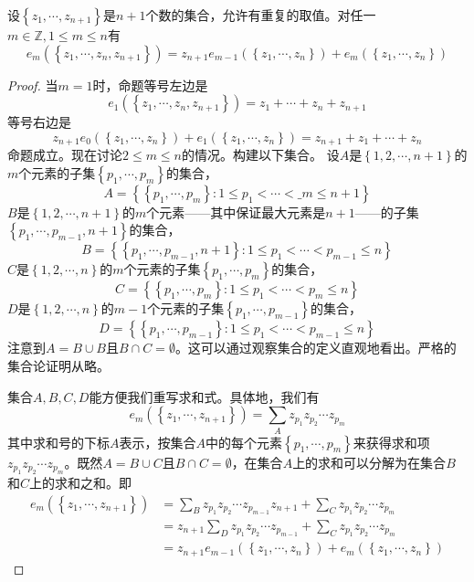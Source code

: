\documentclass[../main.tex]{subfiles}
\begin{document}
\begin{lemma}[初等对称函数的递归性质]\label{lem:A.5}
    设$\left\{z_1,\cdots,z_{n+1}\right\}$是$n+1$个数的集合，允许有重复的取值。对任一$m\in\mathbb{Z},1\leq m\leq n$有
    \[e_m\left(\left\{z_1,\cdots,z_n,z_{n+1}\right\}\right)=z_{n+1}e_{m-1}\left(\left\{z_1,\cdots,z_n\right\}\right)+e_m\left(\left\{z_1,\cdots,z_n\right\}\right)\]
\end{lemma}
\begin{proof}
    当$m=1$时，命题等号左边是
    \[e_1\left(\left\{z_1,\cdots,z_n,z_{n+1}\right\}\right)=z_1+\cdots+z_n+z_{n+1}\]
    等号右边是
    \[z_{n+1}e_0\left(\left\{z_1,\cdots,z_n\right\}\right)+e_1\left(\left\{z_1,\cdots,z_n\right\}\right)=z_{n+1}+z_1+\cdots+z_n\]
    命题成立。现在讨论$2\leq m\leq n$的情况。构建以下集合。
    设$A$是$\left\{1,2,\cdots,n+1\right\}$的$m$个元素的子集$\left\{p_1,\cdots,p_m\right\}$的集合，
    \[A=\left\{\left\{p_1,\cdots,p_m\right\}:1\leq p_1<\cdots<\_m\leq n+1\right\}\]
    $B$是$\left\{1,2,\cdots,n+1\right\}$的$m$个元素——其中保证最大元素是$n+1$——的子集$\left\{p_1,\cdots,p_{m-1},n+1\right\}$的集合，
    \[B=\left\{\left\{p_1,\cdots,p_{m-1},n+1\right\}:1\leq p_1<\cdots<p_{m-1}\leq n\right\}\]
    $C$是$\left\{1,2,\cdots,n\right\}$的$m$个元素的子集$\left\{p_1,\cdots,p_m\right\}$的集合，
    \[C=\left\{\left\{p_1,\cdots,p_m\right\}:1\leq p_1<\cdots<p_m\leq n\right\}\]
    $D$是$\left\{1,2,\cdots,n\right\}$的$m-1$个元素的子集$\left\{p_1,\cdots,p_{m-1}\right\}$的集合，
    \[D=\left\{\left\{p_1,\cdots,p_{m-1}\right\}:1\leq p_1<\cdots<p_{m-1}\leq n\right\}\]
    注意到$A=B\cup B$且$B\cap C=\emptyset$。这可以通过观察集合的定义直观地看出。严格的集合论证明从略。

    集合$A,B,C,D$能方便我们重写求和式。具体地，我们有
    \[e_m\left(\left\{z_1,\cdots,z_{n+1}\right\}\right)=\sum_A z_{p_1}z_{p_2}\cdots z_{p_m}\]
    其中求和号的下标$A$表示，按集合$A$中的每个元素$\left\{p_1,\cdots,p_m\right\}$来获得求和项$z_{p_1}z_{p_2}\cdots z_{p_m}$。既然$A=B\cup C$且$B\cap C=\emptyset$，在集合$A$上的求和可以分解为在集合$B$和$C$上的求和之和。即
    \[\begin{aligned}
            e_m\left(\left\{z_1,\cdots,z_{n+1}\right\}\right) & =\sum_Bz_{p_1}z_{p_2}\cdots z_{p_{m-1}}z_{n+1}+\sum_Cz_{p_1}z_{p_2}\cdots z_{p_m}                       \\
                                                              & =z_{n+1}\sum_Dz_{p_1}z_{p_2}\cdots z_{p_{m-1}}+\sum_Cz_{p_1}z_{p_2}\cdots z_{p_m}                       \\
                                                              & =z_{n+1}e_{m-1}\left(\left\{z_1,\cdots,z_n\right\}\right)+e_m\left(\left\{z_1,\cdots,z_n\right\}\right)
        \end{aligned}
    \]
\end{proof}
\end{document}
